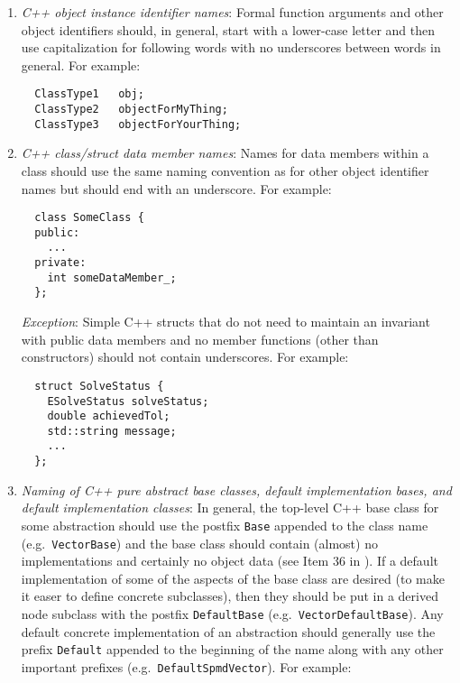 \begin{enumerate}
{}\item\textit{C++ object instance identifier names}: Formal function
arguments and other object identifiers should, in general, start with a
lower-case letter and then use capitalization for following words with no
underscores between words in general.  For example:

{\small\begin{verbatim}
  ClassType1   obj;
  ClassType2   objectForMyThing;
  ClassType3   objectForYourThing;
\end{verbatim}}

{}\item\textit{C++ class/struct data member names}: Names for data members
within a class should use the same naming convention as for other object
identifier names but should end with an underscore.  For example:

{\small\begin{verbatim}
  class SomeClass {
  public:
    ...
  private:
    int someDataMember_;
  };
\end{verbatim}}

{}\textit{Exception}: Simple C++ structs that do not need to maintain an
invariant with public data members and no member functions (other than
constructors) should not contain underscores.  For example:

{\small\begin{verbatim}
  struct SolveStatus {
    ESolveStatus solveStatus;
    double achievedTol;
    std::string message;
    ...
  };
\end{verbatim}}

{}\item\textit{Naming of C++ pure abstract base classes, default
implementation bases, and default implementation classes}: In general, the
top-level C++ base class for some abstraction should use the postfix
{}\texttt{Base} appended to the class name (e.g.\ {}\texttt{Vector\-Base}) and
the base class should contain (almost) no implementations and certainly no
object data (see Item 36 in {}\cite{C++CodingStandards05}).  If a default
implementation of some of the aspects of the base class are desired (to make
it easer to define concrete subclasses), then they should be put in a derived
node subclass with the postfix {}\texttt{DefaultBase} (e.g.\
{}\texttt{Vector\-Default\-Base}).  Any default concrete implementation of an
abstraction should generally use the prefix {}\texttt{Default} appended to the
beginning of the name along with any other important prefixes (e.g.\
{}\texttt{DefaultSpmdVector}).  For example:


\end{enumerate}
